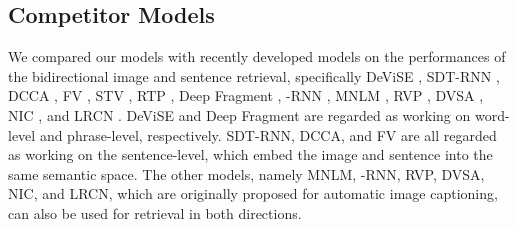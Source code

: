 \documentclass[10pt,twocolumn,letterpaper]{article}
\begin{document}
\subsection{Competitor Models}
\label{sec_competitors}



We {compared} our models with recently developed models on the performances of the bidirectional image and sentence retrieval, specifically DeViSE  \cite{frome_nips2013}, SDT-RNN \cite{socher_tacl2014}, DCCA \cite{yan_cvpr2015}, FV \cite{klein_cvpr2015}, STV \cite{kiros_2015}, RTP \cite{plummer_2015}, Deep Fragment \cite{karpathy_2014}, -RNN \cite{mao_iclr_2015,mao_2014}, MNLM  \cite{kiros_2014}, RVP \cite{chen_2014}, DVSA \cite{karpathy_dvsa_2014}, NIC \cite{vinyals_2014}, and LRCN \cite{donahue_2014}. DeViSE and Deep Fragment are regarded as working on word-level and phrase-level, respectively. SDT-RNN, DCCA, and FV are all regarded as working on the sentence-level, which embed the image and sentence into the same semantic space. The other models, namely MNLM, -RNN, RVP, DVSA, NIC, and LRCN, which are originally proposed for automatic image captioning,
can also be used for retrieval in both directions.
\end{document}
